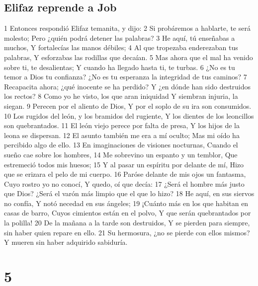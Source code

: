 \section*{Elifaz reprende a Job}


1 Entonces respondió Elifaz temanita, y dijo:
2 Si probáremos a hablarte, te será molesto;
Pero ¿quién podrá detener las palabras?
3 He aquí, tú enseñabas a muchos,
Y fortalecías las manos débiles;
4 Al que tropezaba enderezaban tus palabras,
Y esforzabas las rodillas que decaían. 
5 Mas ahora que el mal ha venido sobre ti, te desalientas;
Y cuando ha llegado hasta ti, te turbas.
6 ¿No es tu temor a Dios tu confianza?
¿No es tu esperanza la integridad de tus caminos? 
7 Recapacita ahora; ¿qué inocente se ha perdido?
Y ¿en dónde han sido destruidos los rectos?
8 Como yo he visto, los que aran iniquidad
Y siembran injuria, la siegan.
9 Perecen por el aliento de Dios,
Y por el soplo de su ira son consumidos.
10 Los rugidos del león, y los bramidos del rugiente,
Y los dientes de los leoncillos son quebrantados. 
11 El león viejo perece por falta de presa,
Y los hijos de la leona se dispersan.
12 El asunto también me era a mí oculto;
Mas mi oído ha percibido algo de ello.
13 En imaginaciones de visiones nocturnas,
Cuando el sueño cae sobre los hombres,
14 Me sobrevino un espanto y un temblor,
Que estremeció todos mis huesos;
15 Y al pasar un espíritu por delante de mí,
Hizo que se erizara el pelo de mi cuerpo.
16 Paróse delante de mis ojos un fantasma,
Cuyo rostro yo no conocí,
Y quedo, oí que decía:
17 ¿Será el hombre más justo que Dios?
¿Será el varón más limpio que el que lo hizo?
18 He aquí, en sus siervos no confía,
Y notó necedad en sus ángeles;
19 ¡Cuánto más en los que habitan en casas de barro,
Cuyos cimientos están en el polvo,
Y que serán quebrantados por la polilla!
20 De la mañana a la tarde son destruidos,
Y se pierden para siempre, sin haber quien repare en ello. 
21 Su hermosura, ¿no se pierde con ellos mismos?
Y mueren sin haber adquirido sabiduría.

\chapter{5}


